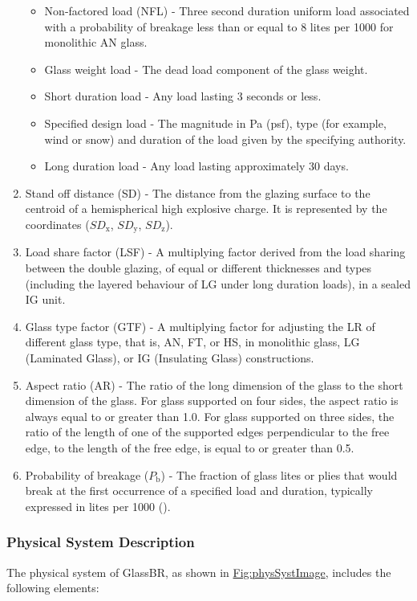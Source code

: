 \documentclass[12pt]{article}
\begin{document}
\begin{enumerate}
\begin{itemize}
\item{Non-factored load (NFL) - Three second duration uniform load associated with a probability of breakage less than or equal to 8 lites per 1000 for monolithic AN glass.}
\item{Glass weight load - The dead load component of the glass weight.}
\item{Short duration load - Any load lasting 3 seconds or less.}
\item{Specified design load - The magnitude in Pa (psf), type (for example, wind or snow) and duration of the load given by the specifying authority.}
\item{Long duration load - Any load lasting approximately 30 days.}
\end{itemize}
\item{Stand off distance (SD) - The distance from the glazing surface to the centroid of a hemispherical high explosive charge. It is represented by the coordinates (${SD_{\text{x}}}$, ${SD_{\text{y}}}$, ${SD_{\text{z}}}$).}
\item{Load share factor (LSF) - A multiplying factor derived from the load sharing between the double glazing, of equal or different thicknesses and types (including the layered behaviour of LG under long duration loads), in a sealed IG unit.}
\item{Glass type factor (GTF) - A multiplying factor for adjusting the LR of different glass type, that is, AN, FT, or HS, in monolithic glass, LG (Laminated Glass), or IG (Insulating Glass) constructions.}
\item{Aspect ratio (AR) - The ratio of the long dimension of the glass to the short dimension of the glass. For glass supported on four sides, the aspect ratio is always equal to or greater than 1.0. For glass supported on three sides, the ratio of the length of one of the supported edges perpendicular to the free edge, to the length of the free edge, is equal to or greater than 0.5.}
\item{Probability of breakage (${P_{\text{b}}}$) - The fraction of glass lites or plies that would break at the first occurrence of a specified load and duration, typically expressed in lites per 1000 (\cite{astm2016}).}
\end{enumerate}
\subsubsection{Physical System Description}
\label{Sec:PhysSyst}
The physical system of GlassBR, as shown in \hyperref[Figure:physSystImage]{Fig:physSystImage}, includes the following elements:
\end{document}
